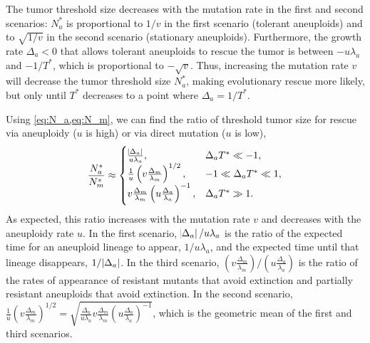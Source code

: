 \documentclass[12pt]{extarticle}
\begin{document}
The tumor threshold size decreases with the mutation rate in the first and second scenarios: $N_a^*$ is proportional to $1/v$ in the first scenario (tolerant aneuploids) and to $\sqrt{1/v}$ in the second scenario (stationary aneuploids). Furthermore, the growth rate $\Delta_a<0$ that allows tolerant aneuploids to rescue the tumor is between $-u\lambda_a$ and  $-1/T^*$, which is proportional to $-\sqrt{v}$. Thus, increasing the mutation rate $v$ will decrease the tumor threshold size $N^*_a$, making evolutionary rescue more likely, but only until $T^*$ decreases to a point where  $\Delta_a =1/T^*$. %

Using \cref{eq:N_a,eq:N_m}, we can find the ratio of threshold tumor size for rescue via aneuploidy ($u$ is high) or via direct mutation ($u$ is low),
\begin{equation} \label{eq:N_ratio}
\frac{N^*_a}{N^*_m} \approx \begin{cases}
    \frac{\abs{\Delta_a}}{u\lambda_a} ,&
  \Delta_a T^* \ll -1 ,\\ 
  \frac{1}{u}\left(v  \frac{\Delta_m}{\lambda_m}\right)^{1/2} ,&
  -1 \ll \Delta_a T^* \ll 1  ,\\ 
  v \frac{\Delta_m}{\lambda_m}  \left(u\frac{\Delta_a}{\lambda_a}\right)^{-1}  ,&
   \Delta_a T^* \gg 1 .
  \end{cases}
\end{equation}
As expected, this ratio increases with the mutation rate $v$ and decreases with the aneuploidy rate $u$.
In the first scenario, $\abs{\Delta_a}/u\lambda_a$ is the ratio of the expected time for an aneuploid lineage to appear, $1/u\lambda_a$, and the expected time until that lineage disappears, $1/\abs{\Delta_a}$.
In the third scenario, $\left(v \frac{\Delta_m}{\lambda_m}\right) / \left(u \frac{\Delta_a}{\lambda_a}\right)$ is the ratio of the rates of appearance of resistant mutants that avoid extinction and partially resistant aneuploids that avoid extinction.
In the second scenario, $\frac{1}{u}\left(v  \frac{\Delta_m}{\lambda_m}\right)^{1/2}=\sqrt{\frac{\Delta_a}{u\lambda_a}  v \frac{\Delta_m}{\lambda_m}  \left(u\frac{\Delta_a}{\lambda_a}\right)^{-1}}$, which is the geometric mean of the first and third scenarios.
\end{document}
